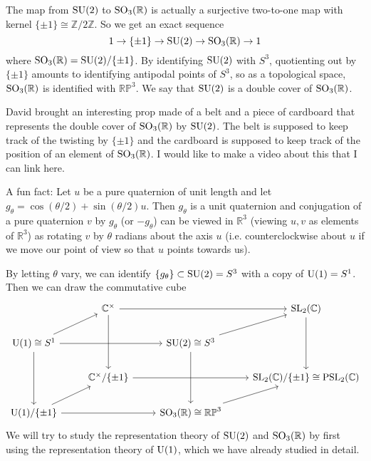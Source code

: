 \documentclass[../../rtnotes.tex]{subfiles}
\begin{document}
The map from $\operatorname{SU}(2)$ to $\operatorname{SO}_3(\mathbb R)$ is actually a surjective two-to-one map with kernel $\{\pm 1\}\cong\mathbb Z/2\mathbb Z$. So we get an exact sequence 
\[1\to \{\pm 1\}\to \operatorname{SU}(2)\to\operatorname{SO}_3(\mathbb R)\to 1\]
where $\operatorname{SO}_3(\mathbb R) = \operatorname{SU}(2)/\{\pm 1\}$. By identifying $\operatorname{SU}(2)$ with $S^3$, quotienting out by $\{\pm 1\}$ amounts to identifying antipodal points of $S^3$, so as a topological space, $\operatorname{SO}_3(\mathbb R)$ is identified with $\mathbb{RP}^3$. We say that $\operatorname{SU}(2)$ is a double cover of $\operatorname{SO}_3(\mathbb R)$.

David brought an interesting prop made of a belt and a piece of cardboard that represents the double cover of $\operatorname{SO}_3(\mathbb R)$ by $\operatorname{SU}(2)$. The belt is supposed to keep track of the twisting by $\{\pm 1\}$ and the cardboard is supposed to keep track of the position of an element of $\operatorname{SO}_3(\mathbb R)$. I would like to make a video about this that I can link here. 

A fun fact: Let $u$ be a pure quaternion of unit length and let $g_\theta = \cos(\theta/2) + \sin(\theta/2)u$. Then $g_\theta$ is a unit quaternion and conjugation of a pure quaternion $v$ by $g_\theta$ (or $-g_\theta$) can be viewed in $\mathbb R^3$ (viewing $u,v$ as elements of $\mathbb R^3$) as rotating $v$ by $\theta$ radians about the axis $u$ (i.e. counterclockwise about $u$ if we move our point of view so that $u$ points towards us).

By letting $\theta$ vary, we can identify $\{g_\theta\}\subset \operatorname{SU}(2) = S^3$ with a copy of $\operatorname{U}(1)=S^1$. Then we can draw the commutative cube
\[\begin{tikzcd}[ampersand replacement=\&]
	\& {\mathbb C^\times} \&\& {\SL_2(\mathbb C)} \\
	{\U(1)\cong S^1} \&\& {\SU(2)\cong S^3} \\
	\& {\mathbb C^\times/\{\pm 1\}} \&\& {\SL_2(\mathbb C)/\{\pm 1\}\cong \PSL_2(\mathbb C)} \\
	{\U(1)/\{\pm 1\}} \&\& {\SO_3(\mathbb R)\cong \mathbb{RP}^3}
	\arrow[from=1-2, to=1-4]
	\arrow[from=1-2, to=3-2]
	\arrow[from=1-4, to=3-4]
	\arrow[from=2-1, to=1-2]
	\arrow[from=2-1, to=2-3]
	\arrow[from=2-1, to=4-1]
	\arrow[from=2-3, to=1-4]
	\arrow[from=2-3, to=4-3]
	\arrow[from=3-2, to=3-4]
	\arrow[from=4-1, to=3-2]
	\arrow[from=4-1, to=4-3]
	\arrow[from=4-3, to=3-4]
\end{tikzcd}\]
We will try to study the representation theory of $\operatorname{SU}(2)$ and $\operatorname{SO}_3(\mathbb R)$ by first using the representation theory of $\operatorname{U}(1)$, which we have already studied in detail.
\end{document}

